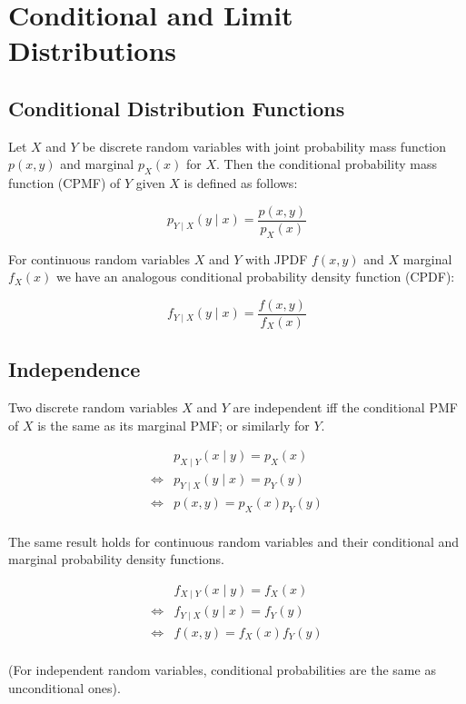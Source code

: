 \section{Conditional and Limit Distributions}

\subsection{Conditional Distribution Functions}

Let $X$ and $Y$ be discrete random variables with joint probability mass function $p(x,y)$ and marginal $p_X(x)$ for $X$. Then the conditional probability mass function (CPMF) of $Y$ given $X$ is defined as follows:

$$ p_{Y\mid X}(y\mid x) = \frac{p(x,y)}{p_X(x)} $$

For continuous random variables $X$ and $Y$ with JPDF $f(x,y)$ and $X$ marginal $f_X(x)$ we have an analogous conditional probability density function (CPDF):

$$ f_{Y\mid X}(y\mid x) = \frac{f(x,y)}{f_X(x)} $$

\subsection{Independence}

Two discrete random variables $X$ and $Y$ are independent iff the conditional PMF of $X$ is the same as its marginal PMF; or similarly for $Y$.

\begin{align*}
         & p_{X\mid Y}(x\mid y) = p_X(x) \\
    \iff & p_{Y\mid X}(y\mid x) = p_Y(y) \\
    \iff & p(x,y) = p_X(x)p_Y(y)         \\
\end{align*}

The same result holds for continuous random variables and their conditional and marginal probability density functions.

\begin{align*}
         & f_{X\mid Y}(x\mid y) = f_X(x) \\
    \iff & f_{Y\mid X}(y\mid x) = f_Y(y) \\
    \iff & f(x,y) = f_X(x)f_Y(y)         \\
\end{align*}

(For independent random variables, conditional probabilities are the same as unconditional ones).

